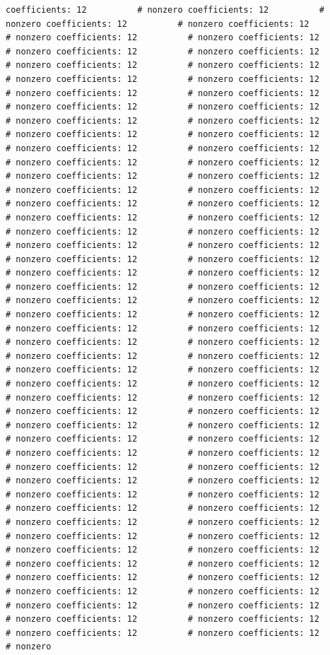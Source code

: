 \documentclass[
]{article}
\begin{document}
\begin{verbatim}
coefficients: 12          # nonzero coefficients: 12          # nonzero coefficients: 12          # nonzero coefficients: 12          # nonzero coefficients: 12          # nonzero coefficients: 12          # nonzero coefficients: 12          # nonzero coefficients: 12          # nonzero coefficients: 12          # nonzero coefficients: 12          # nonzero coefficients: 12          # nonzero coefficients: 12          # nonzero coefficients: 12          # nonzero coefficients: 12          # nonzero coefficients: 12          # nonzero coefficients: 12          # nonzero coefficients: 12          # nonzero coefficients: 12          # nonzero coefficients: 12          # nonzero coefficients: 12          # nonzero coefficients: 12          # nonzero coefficients: 12          # nonzero coefficients: 12          # nonzero coefficients: 12          # nonzero coefficients: 12          # nonzero coefficients: 12          # nonzero coefficients: 12          # nonzero coefficients: 12          # nonzero coefficients: 12          # nonzero coefficients: 12          # nonzero coefficients: 12          # nonzero coefficients: 12          # nonzero coefficients: 12          # nonzero coefficients: 12          # nonzero coefficients: 12          # nonzero coefficients: 12          # nonzero coefficients: 12          # nonzero coefficients: 12          # nonzero coefficients: 12          # nonzero coefficients: 12          # nonzero coefficients: 12          # nonzero coefficients: 12          # nonzero coefficients: 12          # nonzero coefficients: 12          # nonzero coefficients: 12          # nonzero coefficients: 12          # nonzero coefficients: 12          # nonzero coefficients: 12          # nonzero coefficients: 12          # nonzero coefficients: 12          # nonzero coefficients: 12          # nonzero coefficients: 12          # nonzero coefficients: 12          # nonzero coefficients: 12          # nonzero coefficients: 12          # nonzero coefficients: 12          # nonzero coefficients: 12          # nonzero coefficients: 12          # nonzero coefficients: 12          # nonzero coefficients: 12          # nonzero coefficients: 12          # nonzero coefficients: 12          # nonzero coefficients: 12          # nonzero coefficients: 12          # nonzero coefficients: 12          # nonzero coefficients: 12          # nonzero coefficients: 12          # nonzero coefficients: 12          # nonzero coefficients: 12          # nonzero coefficients: 12          # nonzero coefficients: 12          # nonzero coefficients: 12          # nonzero coefficients: 12          # nonzero coefficients: 12          # nonzero coefficients: 12          # nonzero coefficients: 12          # nonzero coefficients: 12          # nonzero coefficients: 12          # nonzero coefficients: 12          # nonzero coefficients: 12          # nonzero coefficients: 12          # nonzero coefficients: 12          # nonzero coefficients: 12          # nonzero coefficients: 12          # nonzero coefficients: 12          # nonzero coefficients: 12          # nonzero coefficients: 12          # nonzero coefficients: 12          # nonzero coefficients: 12          # nonzero coefficients: 12          # nonzero coefficients: 12          # nonzero coefficients: 12          # nonzero 
\end{verbatim}
\end{document}
